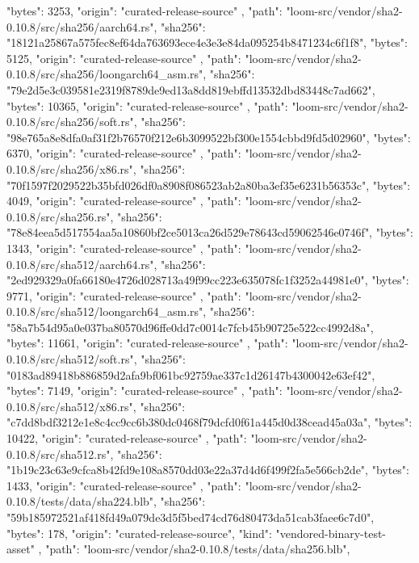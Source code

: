 {{      "bytes": 3253,
      "origin": "curated-release-source"
    },
    {
      "path": "loom-src/vendor/sha2-0.10.8/src/sha256/aarch64.rs",
      "sha256": "18121a25867a575fec8ef64da763693ece4e3e3e84da095254b8471234c6f1f8",
      "bytes": 5125,
      "origin": "curated-release-source"
    },
    {
      "path": "loom-src/vendor/sha2-0.10.8/src/sha256/loongarch64_asm.rs",
      "sha256": "79e2d5e3c039581e2319f8789de9ed13a8dd819ebffd13532dbd83448c7ad662",
      "bytes": 10365,
      "origin": "curated-release-source"
    },
    {
      "path": "loom-src/vendor/sha2-0.10.8/src/sha256/soft.rs",
      "sha256": "98e765a8e8dfa0af31f2b76570f212e6b3099522bf300e1554cbbd9fd5d02960",
      "bytes": 6370,
      "origin": "curated-release-source"
    },
    {
      "path": "loom-src/vendor/sha2-0.10.8/src/sha256/x86.rs",
      "sha256": "70f1597f2029522b35bfd026df0a8908f086523ab2a80ba3ef35e6231b56353c",
      "bytes": 4049,
      "origin": "curated-release-source"
    },
    {
      "path": "loom-src/vendor/sha2-0.10.8/src/sha256.rs",
      "sha256": "78e84eea5d517554aa5a10860bf2ce5013ca26d529e78643cd59062546e0746f",
      "bytes": 1343,
      "origin": "curated-release-source"
    },
    {
      "path": "loom-src/vendor/sha2-0.10.8/src/sha512/aarch64.rs",
      "sha256": "2ed929329a0fa66180e4726d028713a49f99cc223e635078fc1f3252a44981e0",
      "bytes": 9771,
      "origin": "curated-release-source"
    },
    {
      "path": "loom-src/vendor/sha2-0.10.8/src/sha512/loongarch64_asm.rs",
      "sha256": "58a7b54d95a0e037ba80570d96ffe0dd7c0014c7fcb45b90725e522cc4992d8a",
      "bytes": 11661,
      "origin": "curated-release-source"
    },
    {
      "path": "loom-src/vendor/sha2-0.10.8/src/sha512/soft.rs",
      "sha256": "0183ad89418b886859d2afa9bf061bc92759ae337c1d26147b4300042e63ef42",
      "bytes": 7149,
      "origin": "curated-release-source"
    },
    {
      "path": "loom-src/vendor/sha2-0.10.8/src/sha512/x86.rs",
      "sha256": "c7dd8bdf3212e1e8c4cc9cc6b380dc0468f79dcfd0f61a445d0d38cead45a03a",
      "bytes": 10422,
      "origin": "curated-release-source"
    },
    {
      "path": "loom-src/vendor/sha2-0.10.8/src/sha512.rs",
      "sha256": "1b19c23c63e9cfca8b42fd9e108a8570dd03e22a37d4d6f499f2fa5e566cb2de",
      "bytes": 1433,
      "origin": "curated-release-source"
    },
    {
      "path": "loom-src/vendor/sha2-0.10.8/tests/data/sha224.blb",
      "sha256": "59b185972521af418fd49a079de3d5f5bed74cd76d80473da51cab3faee6c7d0",
      "bytes": 178,
      "origin": "curated-release-source",
      "kind": "vendored-binary-test-asset"
    },
    {
      "path": "loom-src/vendor/sha2-0.10.8/tests/data/sha256.blb",
}}
